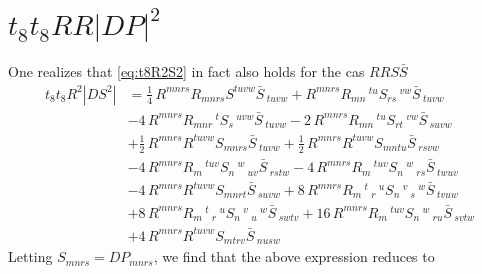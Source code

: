 \section{$t_8 t_8 RR|DP|^2$}
One realizes that \eqref{eq:t8R2S2} in fact also holds for the cas $RRS\bar{S}$
\begin{equation}
\begin{aligned}
t_8 t_8 R^2 |DS^2|
&=\frac{1}{4}\,R^{m n r s} R_{m n r s} S^{t u v w} \bar{S}\,_{t u v w}
+R^{m n r s} R_{m n}\,^{t u} S_{r s}\,^{v w} \bar{S}\,_{t u v w}\\
&-4\,R^{m n r s} R_{m n r}\,^{t} S_{s}\,^{u v w} \bar{S}\,_{t u v w}
-2\,R^{m n r s} R_{m n}\,^{t u} S_{r t}\,^{v w} \bar{S}\,_{s u v w}\\
&+\frac{1}{2}\,R^{m n r s} R^{t u v w} S_{m n r s} \bar{S}\,_{t u v w}
+\frac{1}{2}\,R^{m n r s} R^{t u v w} S_{m n t u} \bar{S}\,_{r s v w}\\
&-4\,R^{m n r s} R_{m}\,^{t u v} S_{n}\,^{w}\,_{u v} \bar{S}\,_{r s t w}
-4\,R^{m n r s} R_{m}\,^{t u v} S_{n}\,^{w}\,_{r s} \bar{S}\,_{t w u v}\\
&-4\,R^{m n r s} R^{t u v w} S_{m n r t} \bar{S}\,_{s u v w}
+8\,R^{m n r s} R_{m}\,^{t}\,_{r}\,^{u} S_{n}\,^{v}\,_{s}\,^{w} \bar{S}\,_{t v u w}\\
&+8\,R^{m n r s} R_{m}\,^{t}\,_{r}\,^{u} S_{n}\,^{v}\,_{u}\,^{w} \bar{S}\,_{s w t v}
+16\,R^{m n r s} R_{m}\,^{t u v} S_{n}\,^{w}\,_{r u} \bar{S}\,_{s v t w}\\
&+4\,R^{m n r s} R^{t u v w} S_{m t r v} \bar{S}\,_{n u s w}
\end{aligned}
\end{equation}
Letting $S_{mnrs} = DP_{mnrs}$, we find that the above expression reduces to
